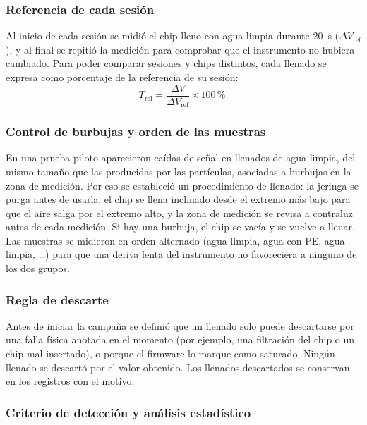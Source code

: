 \subsubsection{Referencia de cada sesión}

Al inicio de cada sesión se midió el chip lleno con agua limpia durante 20~s
($\Delta V_{\mathrm{ref}}$), y al final se repitió la medición para comprobar que el
instrumento no hubiera cambiado. Para poder comparar sesiones y chips distintos, cada
llenado se expresa como porcentaje de la referencia de su sesión:
\begin{equation}
  T_{\mathrm{rel}} = \frac{\Delta V}{\Delta V_{\mathrm{ref}}} \times 100\,\%.
\end{equation}

\subsubsection{Control de burbujas y orden de las muestras}

En una prueba piloto aparecieron caídas de señal en llenados de agua limpia, del
mismo tamaño que las producidas por las partículas, asociadas a burbujas en la zona
de medición. Por eso se estableció un procedimiento de llenado: la jeringa se purga antes de usarla, el chip se llena
inclinado desde el extremo más bajo para que el aire salga por el extremo alto, y la
zona de medición se revisa a contraluz antes de cada medición. Si hay una burbuja,
el chip se vacía y se vuelve a llenar. Las muestras se midieron en orden alternado
(agua limpia, agua con PE, agua limpia, \dots) para que una deriva lenta del
instrumento no favoreciera a ninguno de los dos grupos.

\subsubsection{Regla de descarte}

Antes de iniciar la campaña se definió que un llenado solo puede descartarse por una
falla física anotada en el momento (por ejemplo, una filtración del chip o un chip
mal insertado), o porque el firmware lo marque como saturado. Ningún llenado se
descartó por el valor obtenido. Los llenados descartados se conservan en los
registros con el motivo.

\subsubsection{Criterio de detección y análisis estadístico}


